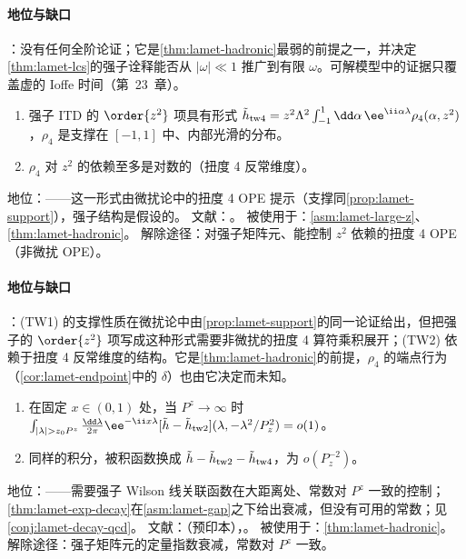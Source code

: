 \paragraph{地位与缺口}
\tagC：没有任何全阶论证；它是\cref{thm:lamet-hadronic}最弱的前提之一，并决定\cref{thm:lamet-lcs}的强子诠释能否从 $|\omega|\ll1$ 推广到有限 $\omega$。可解模型中的证据只覆盖虚的 Ioffe 时间（第~23~章）。

\begin{assumption}\label{asm:lamet-twist4}
\begin{enumerate}[label=(TW\arabic*),leftmargin=3.4em,itemsep=1pt,topsep=2pt]
\item 强子 ITD 的 $\order{z^2}$ 项具有形式 $\tilde h_{\rm tw4}=z^2\Lambda^2\int_{-1}^1\dd\alpha\,\ee^{\ii\alpha\lambda}\rho_4(\alpha,z^2)$，$\rho_4$ 是支撑在 $[-1,1]$ 中、内部光滑的分布。
\item $\rho_4$ 对 $z^2$ 的依赖至多是对数的（扭度 4 反常维度）。
\end{enumerate}
地位：\tagC——这一形式由微扰论中的扭度 4 OPE 提示（支撑同\cref{prop:lamet-support}），强子结构是假设的。
文献：\cite{Braun:2018brg,Radyushkin2017,JiEtAl2021}。
被使用于：\cref{asm:lamet-large-z}、\cref{thm:lamet-hadronic}。
解除途径：对强子矩阵元、能控制 $z^2$ 依赖的扭度 4 OPE（非微扰 OPE）。
\end{assumption}

\paragraph{地位与缺口}
\tagC：(TW1) 的支撑性质在微扰论中由\cref{prop:lamet-support}的同一论证给出，但把强子的 $\order{z^2}$ 项写成这种形式需要非微扰的扭度 4 算符乘积展开；(TW2) 依赖于扭度 4 反常维度的结构。它是\cref{thm:lamet-hadronic}的前提，$\rho_4$ 的端点行为（\cref{cor:lamet-endpoint}中的 $\delta$）也由它决定而未知。

\begin{assumption}\label{asm:lamet-large-z}
\begin{enumerate}[label=(LZ\arabic*),leftmargin=3.4em,itemsep=1pt,topsep=2pt]
\item 在固定 $x\in(0,1)$ 处，当 $P^z\to\infty$ 时 $\int_{|\lambda|>z_0P^z}\frac{\dd\lambda}{2\pi}\ee^{-\ii x\lambda}[\tilde h-\tilde h_{\rm tw2}](\lambda,-\lambda^2/P_z^2)=o(1)$。
\item 同样的积分，被积函数换成 $\tilde h-\tilde h_{\rm tw2}-\tilde h_{\rm tw4}$，为 $o(P_z^{-2})$。
\end{enumerate}
地位：\tagC——需要强子 Wilson 线关联函数在大距离处、常数对 $P^z$ 一致的控制；\cref{thm:lamet-exp-decay}在\cref{asm:lamet-gap}之下给出衰减，但没有可用的常数；见\cref{conj:lamet-decay-qcd}。
文献：\cite{Ji:2026vir}（预印本），\cite{JiEtAl2021,Gao:2021dbh}。
被使用于：\cref{thm:lamet-hadronic}。
解除途径：强子矩阵元的定量指数衰减，常数对 $P^z$ 一致。
\end{assumption}

